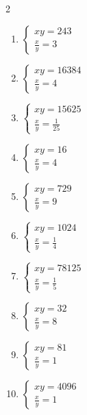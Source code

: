 \documentclass[12pt,a4paper]{article}
\begin{document}
\begin{multicols}{2}
\begin{enumerate}[leftmargin=*, itemsep=6pt]

\item \(\begin{cases} xy=243\\ \frac{x}{y}=3\end{cases}\)

\item \(\begin{cases} xy=16384\\ \frac{x}{y}=4\end{cases}\)

\item \(\begin{cases} xy=15625\\ \frac{x}{y}=\frac{1}{25}\end{cases}\)

\item \(\begin{cases} xy=16\\ \frac{x}{y}=4\end{cases}\)

\item \(\begin{cases} xy=729\\ \frac{x}{y}=9\end{cases}\)

\item \(\begin{cases} xy=1024\\ \frac{x}{y}=\frac{1}{4}\end{cases}\)

\item \(\begin{cases} xy=78125\\ \frac{x}{y}=\frac{1}{5}\end{cases}\)

\item \(\begin{cases} xy=32\\ \frac{x}{y}=8\end{cases}\)

\item \(\begin{cases} xy=81\\ \frac{x}{y}=1\end{cases}\)

\item \(\begin{cases} xy=4096\\ \frac{x}{y}=1\end{cases}\)


\end{enumerate}
\end{multicols}
\end{document}
